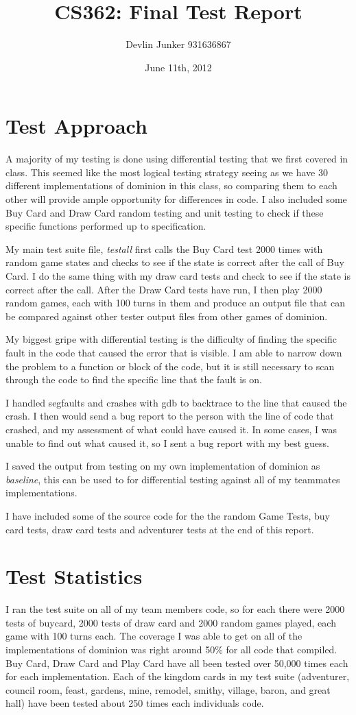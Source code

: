 \documentclass[letterpaper,12pt]{article}
\title{CS362: Final Test Report}
\date{June 11th, 2012}
\author{Devlin Junker 931636867}
\begin{document}
\maketitle


\section{Test Approach}
A majority of my testing is done using differential testing that we first covered in class.
This seemed like the most logical testing strategy seeing as we have 30 different implementations of
dominion in this class, so comparing them to each other will provide ample opportunity for differences in code. 
I also included some Buy Card and Draw Card random testing and unit testing to check if these specific functions
performed up to specification. 

My main test suite file, \emph{testall} first calls the Buy Card test 2000 times with random 
game states and checks to see if the state is correct after the call of Buy Card. I do the same thing with my draw card
tests and check to see if the state is correct after the call. After the Draw Card tests have run, I then play 2000 random
games, each with 100 turns in them and produce an output file that can be compared against other tester output files from other
games of dominion. 

My biggest gripe with differential testing is the difficulty of finding the specific fault in the code that caused
the error that is visible. I am able to narrow down the problem to a function or block of the code, but it is still
necessary to scan through the code to find the specific line that the fault is on. 

I handled segfaults and crashes with gdb to backtrace to the line that caused the crash. I then would send a bug report
to the person with the line of code that crashed, and my assessment of what could have caused it. In some cases, I was unable
to find out what caused it, so I sent a bug report with my best guess.

I saved the output from testing on my own implementation of dominion as \emph{baseline}, this can be used to for differential
testing against all of my teammates implementations.

I have included some of the source code for the the random Game Tests, buy card tests, draw card tests and 
adventurer tests at the end of this report.


\section{Test Statistics}
I ran the test suite on all of my team members code, so for each there were 2000 tests of buycard, 2000 
tests of draw card and 2000 random games played, each game with 100 turns each. The coverage I was able to get
on all of the implementations of dominion was right around 50\% for all code that compiled. Buy Card, Draw Card and 
Play Card have all been tested over 50,000 times each for each implementation. Each of the kingdom cards in my test suite
(adventurer, council room, feast, gardens, mine, remodel, smithy, village, baron, and great hall)
have been tested about 250 times each individuals code.
\end{document}
